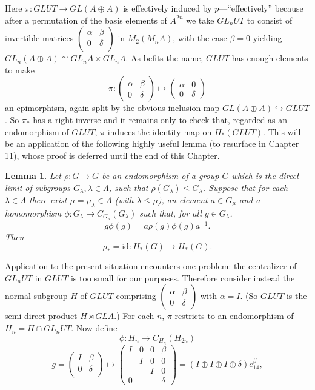 \documentclass[openany,leqno]{book}  %
\newcommand{\id}{\mathrm{id}} %
\newtheorem{lemma}[theorem]{Lemma}
\begin{document}
Here $\pi\colon   GLUT \longrightarrow GL( A \oplus A)$ is effectively induced by $p$---“effectively” because after a permutation of the basis elements of $A^{2n}$ we take $GL_nUT$ to consist of invertible matrices $\begin{pmatrix} \alpha & \beta \\0 &\delta\\  
\end{pmatrix}$ in $ M_2(M_nA)$, with the case $\beta = 0$ yielding $GL_n(A \oplus A)\cong GL_nA \times GL_nA$. As befits the name, $GLUT$ has enough elements to make
\[\pi\colon  \begin{pmatrix}
  \alpha & \beta \\0 &\delta
\end{pmatrix} \mapsto \begin{pmatrix}
  \alpha & 0 \\0 &\delta
\end{pmatrix}\]
an epimorphism, again split by the obvious inclusion map $GL(A \oplus  A) \hookrightarrow GLUT$. So $\pi_*$ has a right inverse and it remains only to check that, regarded as an endomorphism of $GLUT$, $\pi$ induces the identity map on $H_*(GLUT)$. This will be an application of the following highly useful lemma (to resurface in Chapter 11), whose proof is deferred until the end of this Chapter.
\begin{lemma}
  Let $\rho \colon   G \longrightarrow G$ be an endomorphism of a group $G$ which is the direct limit of subgroups $G_\lambda,\lambda \in \Lambda $, such that $\rho(G_\lambda) \leqslant G_\lambda$. Suppose that for each $\lambda \in \Lambda$ there exist $\mu=\mu_\lambda \in \Lambda$ (with $\lambda \leqslant \mu$), an element $a \in G_\mu$ and a homomorphism $\phi \colon   G_\lambda \longrightarrow C_{G_\mu} (G_\lambda)$ such that, 
for all $g\in G_\lambda$,
\[g\phi (g) = a\rho(g)\phi(g)a^{-1} .\]
Then
\[\rho_* = \id \colon   H_*(G) \longrightarrow H_*(G).\]
\end{lemma}

Application to the present situation encounters one problem: the centralizer of $GL_nUT$ in $GLUT$ is too small for our purposes. Therefore consider instead the normal subgroup $H$ of $GLUT$ comprising $\begin{pmatrix}
  \alpha & \beta \\ 0 &\delta
\end{pmatrix}$ with $\alpha = I$. (So $GLUT$ is the semi-direct product $H \rtimes GLA$.) For each $n$, $\pi$ restricts to an endomorphism of $H_n = H\cap GL_nUT$. Now define
\[\phi\colon   H_n \longrightarrow C_{H_n}(H_{2n})\]
\[g=\begin{pmatrix}
  I & \beta \\ 0&\delta\\
\end{pmatrix} 
\mapsto 
\begin{pmatrix}
  I & 0 &0 &\beta \\ & I&0&0 \\ & & I&0 \\ 0& & &\delta
\end{pmatrix}=(I\oplus I\oplus I\oplus \delta)e_{14}^\beta ,\]
\end{document}
